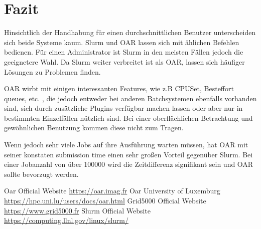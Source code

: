 \section{Fazit}
Hinsichtlich der Handhabung für einen durchschnittlichen Benutzer
unterscheiden sich beide Systeme kaum. Slurm und OAR lassen sich mit ählichen
Befehlen bedienen.
Für einen Administrator ist Slurm in den meisten Fällen jedoch 
die geeignetere Wahl.
Da Slurm weiter verbreitet ist als OAR, lassen sich häufiger 
Lösungen zu Problemen finden.

OAR wirbt mit einigen interessanten Features, wie z.B CPUSet, Besteffort queues, etc. , die
jedoch entweder bei anderen Batchsystemen ebenfalls vorhanden sind,
sich durch zusätzliche Plugins verfügbar machen lassen oder aber nur in bestimmten Einzelfällen nützlich sind.
Bei einer oberflächlichen Betrachtung und gewöhnlichen Benutzung kommen diese nicht zum Tragen.

Wenn jedoch sehr viele Jobs auf ihre Ausführung warten müssen, hat OAR mit seiner konstaten submission time einen 
sehr großen Vorteil gegenüber Slurm. Bei einer Jobanzahl von über 100000 wird die Zeitdifferenz signifikant sein und OAR sollte bevorzugt werden.



\begin{thebibliography}{999}
	    \bibitem [0] {} Oar Official Website \url{https://oar.imag.fr}
	    \bibitem [1] {} Oar University of Luxemburg \url{https://hpc.uni.lu/users/docs/oar.html}
	    \bibitem [2] {} Grid5000 Official Website \url{https://www.grid5000.fr}
	    \bibitem [3] {} Slurm Official Website \url{https://computing.llnl.gov/linux/slurm/}
	\newline
\end{thebibliography}
